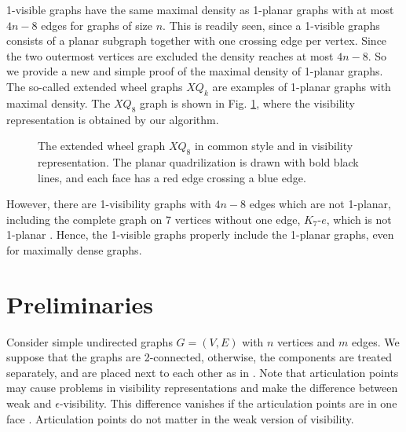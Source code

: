 \documentclass[runningheads]{llncs}
\begin{document}
 1-visible graphs have the same maximal density as
 1-planar graphs with at most $4n-8$ edges for graphs of size $n$.
 This is readily seen, since a 1-visible graphs consists of a planar subgraph together
 with one crossing edge per vertex. Since the two
 outermost vertices are excluded the density reaches at most $4n-8$.
 So we provide a new and simple proof of the maximal density of
 1-planar graphs. The so-called  extended wheel graphs  $XQ_k$ \cite{bhw-1og-84} are examples
 of 1-planar graphs with maximal density.
The $XQ_8$ graph is shown in Fig. \ref{XQ8}, where the visibility
representation is obtained by our algorithm.
\begin{figure}
  \centering
  \quad\quad
  \caption{The extended wheel graph $XQ_8$ in common style and
  in visibility representation. The planar quadrilization is drawn with bold black lines,
  and each face has a red edge crossing a blue edge.
  \label{XQ8}}
\end{figure}
However, there are 1-visibility graphs with $4n-8$ edges which are  not
 1-planar,
 including the complete graph on $7$ vertices without one edge, $K_7$-$e$,   which is not 1-planar
 \cite{bhw-1og-84,s-rm1pg-10}.
 Hence, the 1-visible graphs properly include the 1-planar graphs,
 even for maximally dense graphs.


\iffalse
 The vertex-edge crossings are a novel concept, which needs
further
  investigations, e.g., on the complexity of recognizing
1-visible graphs, on   unique 1-visible representations, on
$\epsilon$ and strong 1-visibility and extensions to $k$-visibility.

\fi



\section{Preliminaries}


Consider simple undirected graphs $G = (V,E)$ with $n$ vertices and
$m$ edges. We suppose that the graphs are 2-connected, otherwise,
the components are treated separately, and are placed next to each
other as in \cite{TT-vrpg-86}. Note that  articulation points may
cause problems in visibility representations and make the difference
between weak and $\epsilon$-visibility. This difference vanishes if
the articulation points are in one face \cite{TT-vrpg-86}.
Articulation points do not matter in the  weak version of
visibility.
\end{document}
